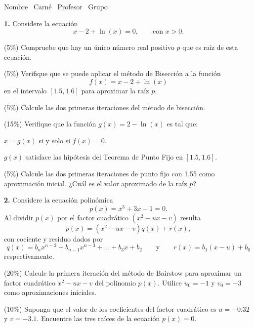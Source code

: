 \documentclass[11pt]{article}
\begin{document}
\examheader

\vspace{6pt}
\noindent Nombre \dotfill\ Carné \dotfill\ Profesor \dotfill\ Grupo \dotfill

\vspace{10pt}
\noindent\textbf{1.} Considere la ecuación
\[
x-2+\ln(x)=0, \qquad \text{con } x>0.
\]
\begin{opciones}
\item (5\%) Compruebe que hay un único número real positivo $p$ que es raíz de esta ecuación.
\item (5\%) Verifique que se puede aplicar el método de Bisección a la función
\[
f(x)=x-2+\ln(x)
\]
en el intervalo $[1.5,1.6]$ para aproximar la raíz $p$.
\item (5\%) Calcule las dos primeras iteraciones del método de bisección.
\item (15\%) Verifique que la función $g(x)=2-\ln(x)$ es tal que:
\begin{romanitos}
\item $x=g(x)$ si y solo si $f(x)=0$.
\item $g(x)$ satisface las hipótesis del Teorema de Punto Fijo en $[1.5,1.6]$.
\end{romanitos}
\item (5\%) Calcule las dos primeras iteraciones de punto fijo con 1.55 como aproximación inicial. ¿Cuál es el valor aproximado de la raíz $p$?
\end{opciones}

\vspace{5mm}
\noindent\textbf{2.} Considere la ecuación polinómica
\[
p(x)=x^3+3x-1=0.
\]
Al dividir $p(x)$ por el factor cuadrático $(x^2-ux-v)$ resulta
\[
p(x)=(x^2-ux-v)q(x)+r(x),
\]
con cociente y residuo dados por
\[
q(x)=b_nx^{n-2}+b_{n-1}x^{n-3}+\ldots+b_3x+b_2 \qquad \text{y} \qquad r(x)=b_1(x-u)+b_0
\]
respectivamente.
\begin{opciones}
\item (20\%) Calcule la primera iteración del método de Bairstow para aproximar un factor cuadrático $x^2-ux-v$ del polinomio $p(x)$. Utilice $u_0=-1$ y $v_0=-3$ como aproximaciones iniciales.
\item (10\%) Suponga que el valor de los coeficientes del factor cuadrático es $u=-0.32$ y $v=-3.1$. Encuentre las tres raíces de la ecuación $p(x)=0$.
\end{opciones}
\end{document}
